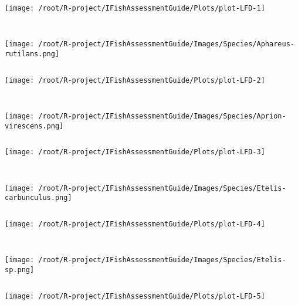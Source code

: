 \documentclass{report}\usepackage[]{graphicx}\usepackage[]{color}
\makeatletter
\def\maxwidth{ %
  \ifdim\Gin@nat@width>\linewidth
    \linewidth
  \else
    \Gin@nat@width
  \fi
}
\newenvironment{kframe}{%
 \def\at@end@of@kframe{}%
 \ifinner\ifhmode%
  \def\at@end@of@kframe{\end{minipage}}%
  \begin{minipage}{\columnwidth}%
 \fi\fi%
 \def\FrameCommand##1{\hskip\@totalleftmargin \hskip-\fboxsep
 \colorbox{shadecolor}{##1}\hskip-\fboxsep
     \hskip-\linewidth \hskip-\@totalleftmargin \hskip\columnwidth}%
 \MakeFramed {\advance\hsize-\width
   \@totalleftmargin\z@ \linewidth\hsize
   \@setminipage}}%
 {\par\unskip\endMakeFramed%
 \at@end@of@kframe}
\newenvironment{knitrout}{}{} %
\newcommand{\verbatimfont}[1]{\def\verbatim@font{#1}}%
\makeatother
\begin{document}
\clearpage
\verbatimfont{\normalfont\rmfamily}
\begin{knitrout}
\color{fgcolor}
\texttt{[image: /root/R-project/IFishAssessmentGuide/Plots/plot-LFD-1]} 
\begin{kframe}\begin{verbatim}
 
\end{verbatim}
\end{kframe}
\texttt{[image: /root/R-project/IFishAssessmentGuide/Images/Species/Aphareus-rutilans.png]}
\begin{kframe}\begin{verbatim}
\end{verbatim}
\end{kframe}
\texttt{[image: /root/R-project/IFishAssessmentGuide/Plots/plot-LFD-2]} 
\begin{kframe}\begin{verbatim}
 
\end{verbatim}
\end{kframe}
\texttt{[image: /root/R-project/IFishAssessmentGuide/Images/Species/Aprion-virescens.png]}
\begin{kframe}\begin{verbatim}
\end{verbatim}
\end{kframe}
\texttt{[image: /root/R-project/IFishAssessmentGuide/Plots/plot-LFD-3]} 
\begin{kframe}\begin{verbatim}
 
\end{verbatim}
\end{kframe}
\texttt{[image: /root/R-project/IFishAssessmentGuide/Images/Species/Etelis-carbunculus.png]}
\begin{kframe}\begin{verbatim}
\end{verbatim}
\end{kframe}
\texttt{[image: /root/R-project/IFishAssessmentGuide/Plots/plot-LFD-4]} 
\begin{kframe}\begin{verbatim}
 
\end{verbatim}
\end{kframe}
\texttt{[image: /root/R-project/IFishAssessmentGuide/Images/Species/Etelis-sp.png]}
\begin{kframe}\begin{verbatim}
\end{verbatim}
\end{kframe}
\texttt{[image: /root/R-project/IFishAssessmentGuide/Plots/plot-LFD-5]} 
\begin{kframe}\begin{verbatim}
 

\end{verbatim}
\end{kframe}
\end{knitrout}
\end{document}
